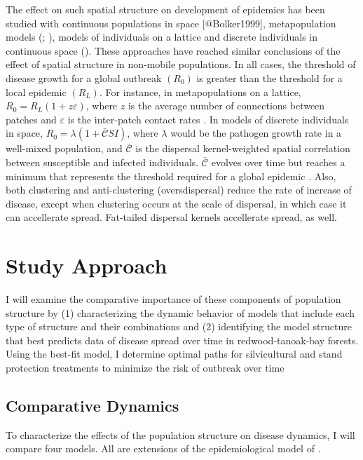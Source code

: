 \documentclass[english,nohyper,nofonts,nobib,nols,twoside]{tufte-handout}
\renewcommand\citep\cite
\let\oldcitet\citet
\renewcommand{\citet}[1]{\oldcitet{#1}\cite{#1}}
\begin{document}
The effect on such spatial structure on development of epidemics has
been studied with continuous populations in space {[}@Bolker1999{]},
metapopulation models (\citet{Park2001}; \citet{Park2002}), models of
individuals on a lattice \citep{Filipe2003, Filipe2004} and discrete
individuals in continuous space (\citet{Brown2004a}). These approaches
have reached similar conclusions of the effect of spatial structure in
non-mobile populations. In all cases, the threshold of disease growth
for a global outbreak $(R_0)$ is greater than the threshold for a local
epidemic $(R_L)$. For instance, in metapopulations on a lattice,
$R_0 = R_L (1 + z\varepsilon)$, where $z$ is the average number of
connections between patches and $\varepsilon$ is the inter-patch contact
rates \citep{Park2001}. In models of discrete individuals in space,
$R_0 = \lambda(1 + \bar{\mathcal{C}} SI)$, where $\lambda$ would be the
pathogen growth rate in a well-mixed population, and $\bar{\mathcal{C}}$
is the dispersal kernel-weighted spatial correlation between susceptible
and infected individuals. $\bar{\mathcal{C}}$ evolves over time but
reaches a minimum that represents the threshold required for a global
epidemic \citep{Brown2004a}. Also, both clustering and anti-clustering
(oversdispersal) reduce the rate of increase of disease, except when
clustering occurs at the scale of dispersal, in which case it can
accellerate spread. Fat-tailed dispersal kernels accellerate spread, as
well.

\section{Study Approach}

I will examine the comparative importance of these components of
population structure by (1) characterizing the dynamic behavior of
models that include each type of structure and their combinations and
(2) identifying the model structure that best predicts data of disease
spread over time in redwood-tanoak-bay forests. Using the best-fit
model, I determine optimal paths for silvicultural and stand protection
treatments to minimize the risk of outbreak over time

\subsection{Comparative Dynamics}

To characterize the effects of the population structure on disease
dynamics, I will compare four models. All are extensions of the
epidemiological model of \citet{Cobb2012}.
\end{document}
